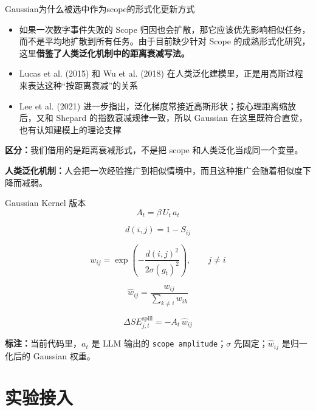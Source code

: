 \documentclass[aspectratio=169]{beamer}
\begin{document}
\begin{frame}[c]{Gaussian为什么被选中作为scope的形式化更新方式}
\small
\begin{center}
\begin{minipage}[t][0.78\textheight][t]{0.84\textwidth}
\justifying
\begin{itemize}
    \item 如果一次数字事件失败的 Scope 归因也会扩散，那它应该优先影响相似任务，而不是平均地扩散到所有任务。由于目前缺少针对 Scope 的成熟形式化研究，这里\textbf{借鉴了人类泛化机制中的距离衰减写法。}
    \item Lucas et al. (2015) 和 Wu et al. (2018) 在人类泛化建模里，正是用高斯过程来表达这种“按距离衰减”的关系
    \item Lee et al. (2021) 进一步指出，泛化梯度常接近高斯形状；按心理距离缩放后，又和 Shepard 的指数衰减规律一致，所以 Gaussian 在这里既符合直觉，也有认知建模上的理论支撑
\end{itemize}

\vspace{0.1cm}
\textbf{区分：}我们借用的是距离衰减形式，不是把 scope 和人类泛化当成同一个变量。

\vfill
{\tiny \color{black!60}\textbf{人类泛化机制：}人会把一次经验推广到相似情境中，而且这种推广会随着相似度下降而减弱。}
\end{minipage}
\end{center}
\end{frame}

\begin{frame}[t]{Gaussian Kernel 版本}
\scriptsize
\justifying
\[
A_t=\beta\, U_t\, a_t
\]

\[
d(i,j)=1-S_{ij}
\]

\[
w_{ij}=\exp\!\left(-\frac{d(i,j)^2}{2\sigma(g_t)^2}\right), \qquad j\neq i
\]

\[
\hat w_{ij}=\frac{w_{ij}}{\sum_{k\neq i} w_{ik}}
\]

\[
\Delta SE^{\text{spill}}_{j,t}
=
-A_t\, \hat w_{ij}
\]

\vspace{0.1cm}
\raggedright
\textbf{标注：}当前代码里，\(a_t\) 是 LLM 输出的 \texttt{scope amplitude}；\(\sigma\) 先固定；\(\hat w_{ij}\) 是归一化后的 Gaussian 权重。
\end{frame}

\section{实验接入}
\end{document}
